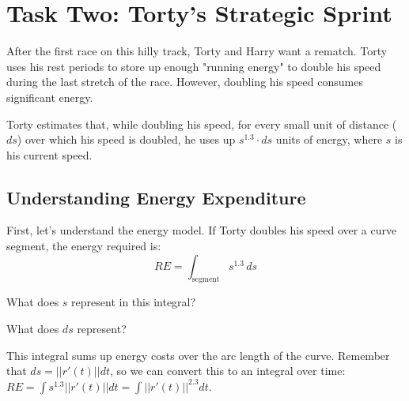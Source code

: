 \documentclass{ximera}
\begin{document}
\section*{Task Two: Torty's Strategic Sprint}

After the first race on this hilly track, Torty and Harry want a rematch. Torty uses his rest periods to store up enough "running energy" to double his speed during the last stretch of the race. However, doubling his speed consumes significant energy.

Torty estimates that, while doubling his speed, for every small unit of distance ($ds$) over which his speed is doubled, he uses up $s^{1.3}\cdot ds$ units of energy, where $s$ is his current speed.

\subsection*{Understanding Energy Expenditure}

\begin{problem}
    First, let's understand the energy model. If Torty doubles his speed over a curve segment, the energy required is:
    \[RE=\int_{\text{segment}} s^{1.3}\, ds\]
    
    What does $s$ represent in this integral?
    \begin{multipleChoice}
    \end{multipleChoice}
    
    What does $ds$ represent?
    \begin{multipleChoice}
    \end{multipleChoice}
    
    \begin{feedback}
        This integral sums up energy costs over the arc length of the curve. Remember that $ds=||r'(t)||dt$, so we can convert this to an integral over time: $RE=\int s^{1.3}||r'(t)||dt=\int ||r'(t)||^{2.3}dt$.
    \end{feedback}
\end{problem}
\end{document}
